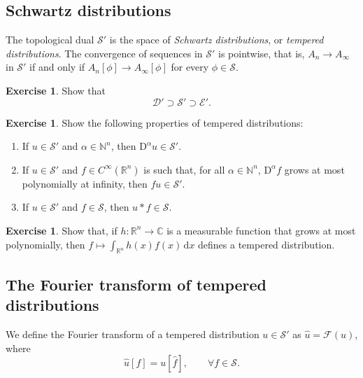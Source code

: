 \documentclass[a4paper,9pt]{amsart}
\newcommand{\scr}[1]{\mathscr{#1}}
\newcommand{\N}{\mathbb{N}}	%
\newcommand{\R}{\mathbb{R}}	%
\newcommand{\C}{\mathbb{C}}	%
\newcommand{\did}{\,\mathrm{d}}	%
\newcommand{\Diff}{\mathrm{D}}
\theoremstyle{plain}
\theoremstyle{definition}
\newtheorem{exercise}[proposition]{Exercise}%
\theoremstyle{remark}
\begin{document}
\subsection{Schwartz distributions}
The topological dual $\scr S'$ is the space of \emph{Schwartz distributions}, or \emph{tempered distributions}.
The convergence of sequences in $\scr S'$ is pointwise, that is, 
$A_n\to A_\infty$ in $\scr S'$ if and only if $A_n[\phi] \to A_\infty[\phi]$ for every $\phi\in\scr S$.

\begin{exercise}
	Show that
	\begin{equation}
		\scr D' \supset \scr S' \supset \scr E' .
	\end{equation}
\end{exercise}

\begin{exercise}
	Show the following properties of tempered distributions:
	\begin{enumerate}
	\item
	If $u\in\scr S'$ and $\alpha\in\N^n$, then $\Diff^\alpha u\in\scr S'$.
	\item
	If $u\in\scr S'$ and $f\in C^\infty(\R^n)$ is such that, 
	for all $\alpha\in\N^n$, $\Diff^\alpha f$ grows at most polynomially at infinity,
	then $fu\in\scr S'$.
	\item
	If $u\in\scr S'$ and $f\in\scr S$, then $u*f\in\scr S$.
	\end{enumerate}
\end{exercise}

\begin{exercise}
	Show that, if $h:\R^n\to\C$ is a measurable function that grows at most polynomially, then $f\mapsto \int_{\R^n} h(x)f(x)\did x$ defines a tempered distribution.
\end{exercise}

\subsection{The Fourier transform of tempered distributions}
We define the Fourier transform of a tempered distribution $u\in\scr S'$
as $\hat u=\scr F(u)$, where
\begin{equation}
	\hat u[f] = u[\hat f] ,
	\qquad\forall f\in\scr S.
\end{equation}
\end{document}
